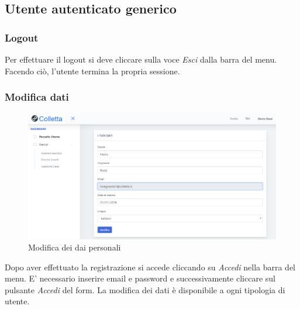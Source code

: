 	
\subsection{Utente autenticato generico}

    \subsubsection{Logout}
    Per effettuare il {logout} si deve cliccare sulla voce \textit{Esci} dalla barra del menu. Facendo ciò, l'utente termina la propria sessione.
    \subsubsection{Modifica dati}
    	\begin{figure}[H]
        	\centering
        	\includegraphics[width=1\linewidth]{sez/img/autenticazione/modati.PNG} 
        	\caption{Modifica dei dai personali}\label{fig:1}
    	\end{figure}
    Dopo aver effettuato la registrazione si accede cliccando su \textit{Accedi} nella barra del menu. E' necessario inserire email e password e successivamente cliccare sul pulsante \textit{Accedi} del form. La modifica dei dati è disponibile a ogni tipologia di utente.

\newpage
